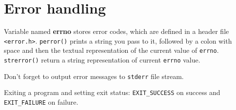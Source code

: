 \documentclass[letterpaper, 10pt]{article}
\newcommand{\lin}[1]{\lstinline{#1}}
\begin{document}
\section{Error handling}
Variable named \textbf{errno} stores error codes, which are defined in a header file \lstinline{<error.h>}. \lstinline{perror()} prints a string you pass to it,
followed by a colon with space and then the textual representation of the current value of \lstinline{errno}. \lin{strerror()} return a string representation
of current \lin{errno} value.

Don't forget to output error messages to \lin{stderr} file stream.

Exiting a program and setting exit status: \lin{EXIT_SUCCESS} on success and \lin{EXIT_FAILURE} on failure.
\end{document}
